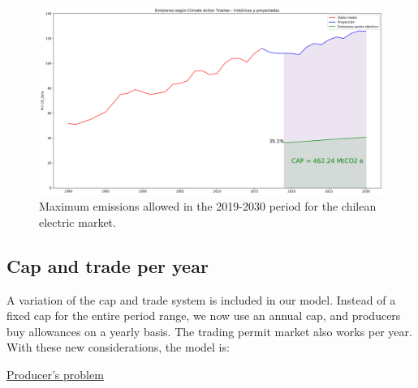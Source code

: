 \documentclass[11pt, letterpaper]{article}
\newcommand{\fel}[1]{{\color{red}({\bf FF:}#1)}}
\begin{document}




\begin{figure}[ht!]
 \includegraphics[width=\textwidth]{Apuntes/cap.png}
 \caption{Maximum emissions allowed in the 2019-2030 period for the chilean electric market. }
  \label{fig:cap}
  \end{figure}

\subsection{Cap and trade per year}

A variation of the cap and trade system is included in our model. Instead of a fixed cap for the entire period range, we now use an annual cap, and producers buy allowances on a yearly basis. The trading permit market also works per year. With these new considerations, the model is:

\underline{Producer's problem}
\end{document}
